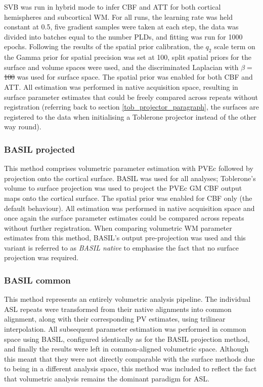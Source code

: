 \documentclass[12pt]{report}
\providecommand{\DIFaddtex}[1]{{\protect\color{blue}\uwave{#1}}} %
\providecommand{\DIFdeltex}[1]{{\protect\color{red}\sout{#1}}}                      %
\providecommand{\DIFaddbegin}{} %
\providecommand{\DIFaddend}{} %
\providecommand{\DIFdelbegin}{} %
\providecommand{\DIFdelend}{} %
\providecommand{\DIFadd}[1]{\texorpdfstring{\DIFaddtex{#1}}{#1}} %
\providecommand{\DIFdel}[1]{\texorpdfstring{\DIFdeltex{#1}}{}} %
\newcommand{\DIFscaledelfig}{0.5}
\newlength{\DIFdelgraphicswidth} %
\newlength{\DIFdelgraphicsheight} %
\newcommand{\DIFaddincludegraphics}[2][]{{\color{blue}\fbox{\DIFOincludegraphics[#1]{#2}}}} %
\newcommand{\DIFdelincludegraphics}[2][]{%
\sbox{\DIFdelgraphicsbox}{\DIFOincludegraphics[#1]{#2}}%
\settoboxwidth{\DIFdelgraphicswidth}{\DIFdelgraphicsbox} %
\settoboxtotalheight{\DIFdelgraphicsheight}{\DIFdelgraphicsbox} %
\scalebox{\DIFscaledelfig}{%
\parbox[b]{\DIFdelgraphicswidth}{\usebox{\DIFdelgraphicsbox}\\[-\baselineskip] \rule{\DIFdelgraphicswidth}{0em}}\llap{\resizebox{\DIFdelgraphicswidth}{\DIFdelgraphicsheight}{%
\setlength{\unitlength}{\DIFdelgraphicswidth}%
\begin{picture}(1,1)%
\thicklines\linethickness{2pt} %
{\color[rgb]{1,0,0}\put(0,0){\framebox(1,1){}}}%
{\color[rgb]{1,0,0}\put(0,0){\line( 1,1){1}}}%
{\color[rgb]{1,0,0}\put(0,1){\line(1,-1){1}}}%
\end{picture}%
}\hspace*{3pt}}} %
} %
\DeclareRobustCommand{\DIFaddbegin}{\DIFOaddbegin \let\includegraphics\DIFaddincludegraphics} %
\DeclareRobustCommand{\DIFaddend}{\DIFOaddend \let\includegraphics\DIFOincludegraphics} %
\DeclareRobustCommand{\DIFdelbegin}{\DIFOdelbegin \let\includegraphics\DIFdelincludegraphics} %
\DeclareRobustCommand{\DIFdelend}{\DIFOaddend \let\includegraphics\DIFOincludegraphics} %
\begin{document}
SVB was run in hybrid mode to infer CBF and ATT for both cortical hemispheres and subcortical WM. For all runs, the learning rate was held constant at 0.5, five gradient samples were taken at each step, the data was divided into batches equal to the number PLDs, and fitting was run for 1000 epochs. Following the results of the spatial prior calibration, the $q_2$ scale term on the Gamma prior for spatial precision was set at 100, split spatial priors for the surface and volume spaces were used, and the discriminated Laplacian with $\beta =$ \DIFdelbegin \DIFdel{100 }\DIFdelend \DIFaddbegin \DIFadd{1000 }\DIFaddend was used for surface space. The spatial prior was enabled for both CBF and ATT. All estimation was performed in native acquisition space, resulting in surface parameter estimates that could be freely compared across repeats without registration (referring back to section \ref{tob_projector_paragraph}, the surfaces are registered to the data when initialising a Toblerone projector instead of the other way round). 

\subsubsection{BASIL projected}

This method comprises volumetric parameter estimation with PVEc followed by projection onto the cortical surface. BASIL was used for all analyses; Toblerone's volume to surface projection was used to project the PVEc GM CBF output maps onto the cortical surface. The spatial prior was enabled for CBF only (the default behaviour). All estimation was performed in native acquisition space and once again the surface parameter estimates could be compared across repeats without further registration. When comparing volumetric WM parameter estimates from this method, BASIL's output pre-projection was used and this variant is referred to as \textit{BASIL native} to emphasise the fact that no surface projection was required. 

\subsubsection{BASIL common}

This method represents an entirely volumetric analysis pipeline. The individual ASL repeats were transformed from their native alignments into common alignment, along with their corresponding PV estimates, using trilinear interpolation. All subsequent parameter estimation was performed in common space using BASIL, configured identically as for the BASIL projection method, and finally the results were left in common-aligned volumetric space. Although this meant that they were not directly comparable with the surface methods due to being in a different analysis space, this method was included to reflect the fact that volumetric analysis remains the dominant paradigm for ASL. 
\end{document}
